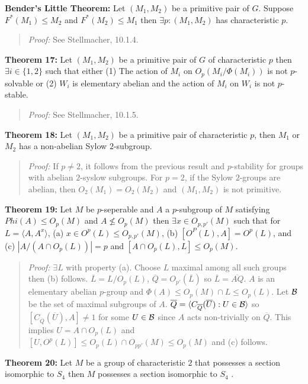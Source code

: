 {\bf Bender's Little Theorem:}
Let $(M_1, M_2)$ be a primitive pair of $G$.  Suppose 
$F^*(M_1) \le M_2$ and
$F^*(M_2) \le M_1$ then $\exists p: (M_1, M_2)$ has characteristic $p$.
\begin{quote}
\emph{Proof:}  
See Stellmacher, 10.1.4.
\end{quote}
{\bf Theorem 17:}
Let $(M_1, M_2)$ be a primitive pair of $G$ of characteristic $p$ then $\exists i \in \{1 , 2 \}$
such that either 
(1) The action of $M_i$ on $O_p(M_i/ \Phi(M_i))$ is not $p$-solvable or
(2) $W_i$ is elementary abelian and the action of $M_i$ on $W_i$ is not $p$-stable.
\begin{quote}
\emph{Proof:}  
See Stellmacher, 10.1.5.
\end{quote}
{\bf Theorem 18:}
Let $(M_1, M_2)$ be a primitive pair of characteristic $p$, then $M_1$ or
$M_2$ has a non-abelian Sylow $2$-subgroup.
\begin{quote}
\emph{Proof:}  
If $p \neq 2$, it follows from the previous result and $p$-stability for groups with abelian $2$-syslow subgroups.
For $p= 2$, if the Sylow $2$-groups are abelian, then $O_2(M_1)= O_2(M_2)$ and $(M_1, M_2)$ is not primitive.
\end{quote}
{\bf Theorem 19:}
Let $M$ be $p$-seperable and $A$ a $p$-subgroup of $M$ satisfying
$Phi(A) \leq O_p(M)$ and $A \nleq O_p(M)$ then $\exists x \in O_{p,p'}(M)$
such that for $L= \langle A, A^x \rangle$, (a) $x \in O^p(L) \leq O_{p,p'}(M)$,
(b) $[O^P(L),A]= O^p(L)$, and (c) $|A/(A \cap O_p(L))|=p$ and $[A \cap O_p(L), L] \leq O_p(M)$.
\begin{quote}
\emph{Proof:}  
$\exists L$ with property (a).  Choose $L$ maximal among all such groups then (b) follows.
${\overline L}= L/O_p(L)$, ${\overline Q}= O_{p'}({\overline L})$ so ${\overline L} = {\overline {AQ}}$.
$A$ is an elementary abelian $p$-group and
$\Phi(A) \leq O_p(M) \cap L \leq O_p(L)$.  Let ${\cal B}$ be the set of maximal subgroups of $A$.
${\overline Q}=  \langle C_{\overline Q}({\overline U}): U \in {\cal B} \rangle$ so
$[C_{\overline Q}({\overline U}), A] \neq 1$ for some $U \in {\cal B}$ since $A$ acts non-trivially
on ${\overline Q}$.  This implies $U= A \cap O_p(L)$ and
$[U, O^p(L)] \leq O_p(L) \cap O_{pp'}(M) \leq O_p(M)$ and (c) follows.
\end{quote}
{\bf Theorem 20:}
Let $M$ be a group of characteristic $2$ that 
possesses a section isomorphic to $S_4$  then $M$
possesses a section isomorphic to $S_4$ .
